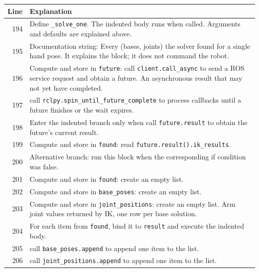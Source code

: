 \documentclass[11pt,a4paper]{book}
\begin{document}
\begin{longtable}{r p{}}

\textbf{Line} & \textbf{Explanation} \\ \hline \endhead

194 & Define \texttt{\_solve\_one}. The indented body runs when called. Arguments and defaults are explained above. \\

195 & Documentation string: Every (bases, joints) the solver found for a single hand pose. It explains the block; it does not command the robot. \\

196 & Compute and store in \texttt{future}: call \texttt{client.call\_async} to send a ROS service request and obtain a future. An asynchronous result that may not yet have completed. \\

197 & call \texttt{rclpy.spin\_until\_future\_complete} to process callbacks until a future finishes or the wait expires. \\

198 & Enter the indented branch only when call \texttt{future.result} to obtain the future's current result. \\

199 & Compute and store in \texttt{found}: read \texttt{future.result().ik\_results}.  \\

200 & Alternative branch: run this block when the corresponding if condition was false. \\

201 & Compute and store in \texttt{found}: create an empty list.  \\

202 & Compute and store in \texttt{base\_poses}: create an empty list.  \\

203 & Compute and store in \texttt{joint\_positions}: create an empty list. Arm joint values returned by IK, one row per base solution. \\

204 & For each item from \texttt{found}, bind it to \texttt{result} and execute the indented body. \\

205 & call \texttt{base\_poses.append} to append one item to the list. \\

206 & call \texttt{joint\_positions.append} to append one item to the list. \\


\end{longtable}
\end{document}

